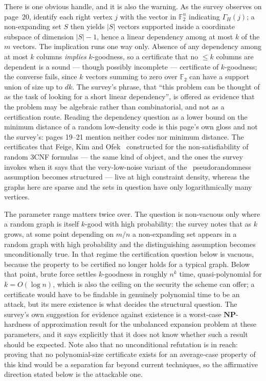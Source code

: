 \documentclass{aicr-conjecture}
\newcommand{\NP}{\mathbf{NP}}
\newcommand{\Nbr}{\Gamma_H}
\newcommand{\FF}{\mathbb{F}_2}
\begin{document}
There is one obvious handle, and it is also the warning. As the survey
observes on page~20, identify each right vertex $j$ with the vector in
$\FF^n$ indicating $\Nbr(j)$; a non-expanding set $S$ then yields $|S|$
vectors supported inside a coordinate subspace of dimension $|S|-1$,
hence a linear dependency among at most $k$ of the $m$ vectors. The
implication runs one way only. Absence of any dependency among at most
$k$ columns \emph{implies} $k$-goodness, so a certificate that no
$\le k$ columns are dependent is a sound --- though possibly
incomplete --- certificate of $k$-goodness; the converse fails, since
$k$ vectors summing to zero over $\FF$ can have a support union of size
up to $dk$. The survey's phrase, that ``this problem can be thought of
as the task of looking for a short linear dependency'', is offered as
evidence that the problem may be algebraic rather than combinatorial,
and not as a certification route. Reading the dependency question as a
lower bound on the minimum distance of a random low-density code is
this page's own gloss and not the survey's: pages 19--21 mention
neither codes nor minimum distance. The certificates that Feige, Kim
and Ofek~\cite{FKO06} constructed for the non-satisfiability of random
3CNF formulas --- the same kind of object, and the ones the survey
invokes when it says that the very-low-noise variant of
the~\cite{ABW10} pseudorandomness assumption becomes structured ---
live at high constraint density, whereas the graphs here are sparse and
the sets in question have only logarithmically many vertices.

The parameter range matters twice over. The question is non-vacuous
only where a random graph is itself $k$-good with high probability: the
survey notes that as $k$ grows, at some point depending on $m/n$ a
non-expanding set appears in a random graph with high probability and
the distinguishing assumption becomes unconditionally true. In that
regime the certification question below is vacuous, because the
property to be certified no longer holds for a typical graph. Below
that point, brute force settles $k$-goodness in roughly $n^{k}$ time,
quasi-polynomial for $k = O(\log n)$, which is also the ceiling on the
security the scheme can offer; a certificate would have to be findable
in genuinely polynomial time to be an attack, but its mere existence is
what decides the structural question. The survey's own suggestion for
evidence against existence is a worst-case $\NP$-hardness of
approximation result for the unbalanced expansion problem at these
parameters, and it says explicitly that it does not know whether such a
result should be expected. Note also that no unconditional refutation
is in reach: proving that no polynomial-size certificate exists for an
average-case property of this kind would be a separation far beyond
current techniques, so the affirmative direction stated below is the
attackable one.
\end{document}
